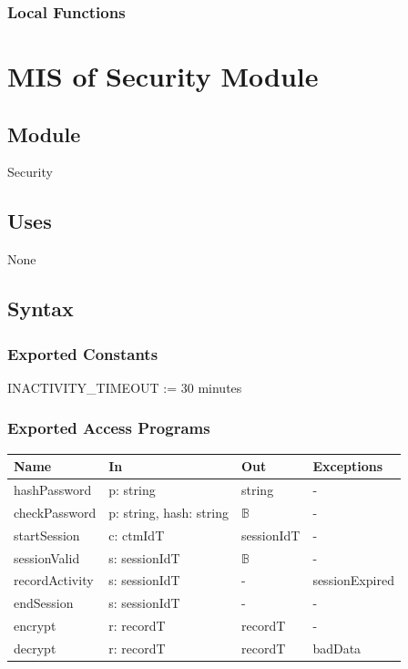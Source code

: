 \documentclass[12pt, titlepage]{article}
\begin{document}
\subsubsection{Local Functions}

\newpage

\section{MIS of Security Module} \label{mis:Security}

\subsection{Module}

Security

\subsection{Uses}

None

\subsection{Syntax}

\subsubsection{Exported Constants}

INACTIVITY\_TIMEOUT := 30 minutes

\subsubsection{Exported Access Programs}

\begin{center}
\small
\begin{tabular}{p{3.3cm} p{4.7cm} p{2.6cm} p{2.8cm}}
\hline
\textbf{Name} & \textbf{In} & \textbf{Out} & \textbf{Exceptions} \\
\hline
hashPassword & p: string & string & - \\
checkPassword & p: string, hash: string & $\mathbb{B}$ & - \\
startSession & c: ctmIdT & sessionIdT & - \\
sessionValid & s: sessionIdT & $\mathbb{B}$ & - \\
recordActivity & s: sessionIdT & - & sessionExpired \\
endSession & s: sessionIdT & - & - \\
encrypt & r: recordT & recordT & - \\
decrypt & r: recordT & recordT & badData \\
\hline
\end{tabular}
\end{center}
\end{document}
